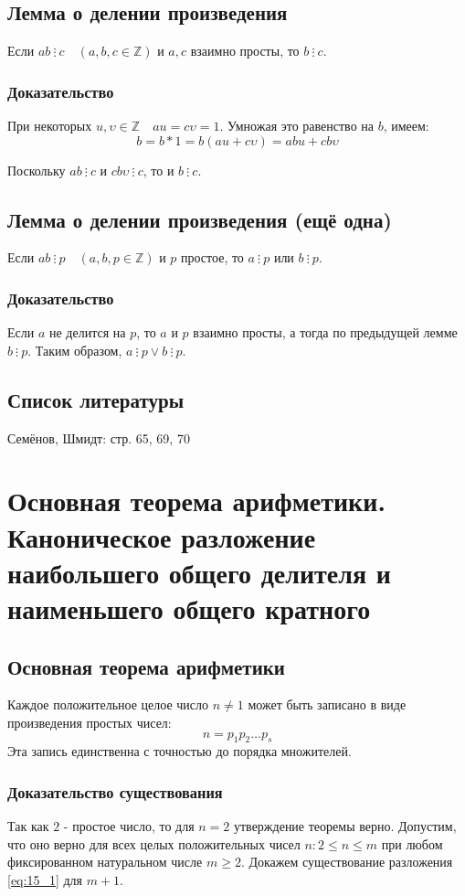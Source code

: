 \documentclass{article}
\newcommand{\divs}{~\vdots~}
\begin{document}
\subsection{Лемма о делении произведения}
Если $ab \divs c \quad (a, b, c \in \mathbb Z)$ и $a, c$ взаимно просты, то $b \divs c$.
\subsubsection*{Доказательство}
При некоторых $u, \upsilon \in \mathbb Z \quad au = c \upsilon = 1$. Умножая это равенство на $b$, имеем:
\[b = b * 1 = b(au + c \upsilon) = abu + cb \upsilon\]

Поскольку $ab \divs c$ и $cb \upsilon \divs c$, то и $b \divs c$.

\subsection{Лемма о делении произведения (ещё одна)}
Если $ab \divs p \quad (a, b, p \in \mathbb Z)$ и $p$ простое, то $a \divs p$ или $b \divs p$.
\subsubsection*{Доказательство}
Если $a$ не делится на $p$, то $a$ и $p$ взаимно просты, а тогда по предыдущей лемме $b \divs p$. Таким образом, $a \divs p \vee b \divs p$.

\subsection*{Список литературы}
Семёнов, Шмидт: стр. 65, 69, 70



\newpage
\section{Основная теорема арифметики. Каноническое разложение наибольшего общего делителя и наименьшего общего кратного}
\subsection{Основная теорема арифметики}
Каждое положительное целое число $n \neq 1$ может быть записано в виде произведения простых чисел:
\begin{equation}
\label{eq:15_1}
n = p_1 p_2 \dots p_s
\end{equation}
Эта запись единственна с точностью до порядка множителей.
\subsubsection{Доказательство существования}
Так как $2$ - простое число, то для $n = 2$ утверждение теоремы верно. Допустим, что оно верно для всех целых положительных чисел $n: 2 \leq n \leq m$ при любом фиксированном натуральном числе $m \geq 2$. Докажем существование разложения \eqref{eq:15_1} для $m+1$.
\end{document}
